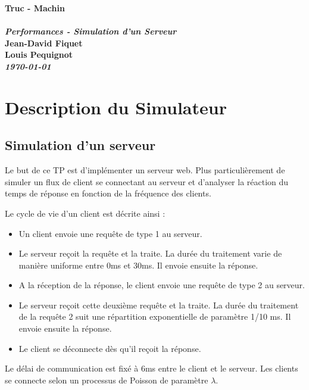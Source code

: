 \documentclass[a4paper, 12pt]{exam}
\newcommand{\titleinfo}{Truc - Machin}
\newcommand{\subtitleinfo}{Performances - Simulation d'un Serveur}
\newcommand{\auteur}{Jean-David Fiquet\\ Louis Pequignot}
\begin{document}
\setcounter{tocdepth}{4}



\begin{center}
	\textbf{\Huge{\titleinfo }} \\[0.5cm]
	\hrulefill \\ [0.5cm]
	\textbf{\textit{\Large \subtitleinfo}} \\ [0.3cm]
	\textbf{\auteur} \\ [0.3cm]
	\textbf{\textit{\Large \today}} \\ [0.3cm]

\vfill

\end{center}

\newpage
\tableofcontents
\newpage

\section{Description du Simulateur}
\subsection{Simulation d'un serveur}

Le but de ce TP est d'implémenter un serveur web. Plus particulièrement de simuler un flux de client se connectant au serveur et d'analyser la réaction du temps de réponse en fonction de la fréquence des clients.

Le cycle de vie d'un client est décrite ainsi :

\begin{itemize}
  \item Un client envoie une requête de type 1 au serveur.
  \item Le serveur reçoit la requête et la traite. La durée du traitement varie de manière uniforme entre 0ms et 30ms. Il envoie ensuite la réponse.
  \item A la réception de la réponse, le client envoie une requête de type 2 au serveur.
  \item Le serveur reçoit cette deuxième requête et la traite. La durée du traitement de la requête 2 suit une répartition exponentielle de paramètre 1/10 ms. Il envoie ensuite la réponse.
  \item Le client se déconnecte dès qu'il reçoit la réponse.
\end{itemize}

Le délai de communication est fixé à 6ms entre le client et le serveur. Les clients se connecte selon un processus de Poisson de paramètre $\lambda$.
\end{document}
